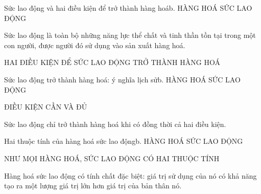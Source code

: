\documentclass[aspectratio=169,11pt]{beamer}
\begin{document}
\begin{frame}{Sức lao động và hai điều kiện để trở thành hàng hoá}{b. HÀNG HOÁ SỨC LAO ĐỘNG}
\begin{Concept}Sức lao động là toàn bộ những năng lực thể chất và tinh thần tồn tại trong một con người, được người đó sử dụng vào sản xuất hàng hoá.\end{Concept}
\begin{PTTEPoints}{HAI ĐIỀU KIỆN ĐỂ SỨC LAO ĐỘNG TRỞ THÀNH HÀNG HOÁ}
\end{PTTEPoints}
\end{frame}

\begin{frame}{Sức lao động trở thành hàng hoá: ý nghĩa lịch sử}{b. HÀNG HOÁ SỨC LAO ĐỘNG}
\begin{PTTEPoints}{ĐIỀU KIỆN CẦN VÀ ĐỦ}
\end{PTTEPoints}
\begin{Takeaway}Sức lao động chỉ trở thành hàng hoá khi có đồng thời cả hai điều kiện.\end{Takeaway}
\end{frame}

\begin{frame}{Hai thuộc tính của hàng hoá sức lao động}{b. HÀNG HOÁ SỨC LAO ĐỘNG}
\begin{PTTEPoints}{NHƯ MỌI HÀNG HOÁ, SỨC LAO ĐỘNG CÓ HAI THUỘC TÍNH}
\end{PTTEPoints}
\begin{KeyClaim}Hàng hoá sức lao động có tính chất đặc biệt: giá trị sử dụng của nó có khả năng tạo ra một lượng giá trị lớn hơn giá trị của bản thân nó.\end{KeyClaim}
\end{frame}
\end{document}
